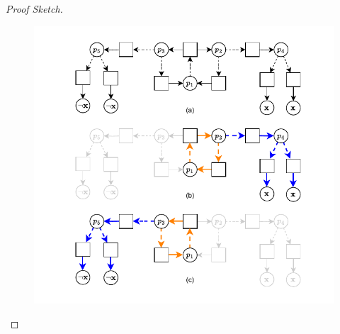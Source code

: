 \begin{lemma}
\begin{proof}[Proof Sketch]
\begin{figure}
    \centering
    \includegraphics{data/sat_reduction_boolean_gadget2.pdf}
    \caption[]{}
    \label{fig:sat_reduction_boolean_gadget2}
\end{figure}

\end{proof}
\end{lemma}



